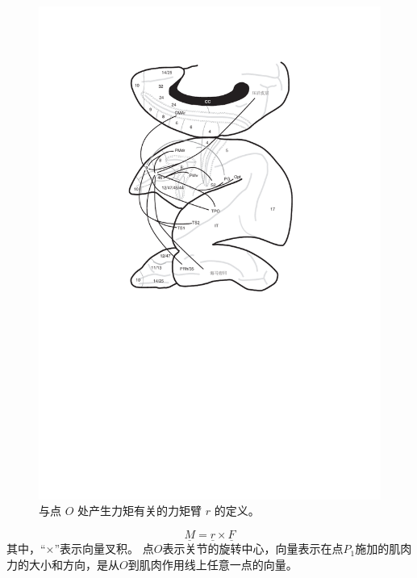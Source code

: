 \begin{figure}[!htb]
	\centering
	\includegraphics[width=0.9\linewidth]{chap6/6_2}
	\caption{与点 $O$ 处产生力矩有关的力矩臂 $r$ 的定义。 \label{fig:6_2}}
\end{figure}


\begin{equation}
	\underline{M} = \underline{r} \times \underline{F}
	\label{eq:6_3}
\end{equation}
%
其中，“$\times$”表示向量叉积。
点$O$表示关节的旋转中心，向量表示在点$P_1$施加的肌肉力的大小和方向，是从$O$到肌肉作用线上任意一点的向量。


